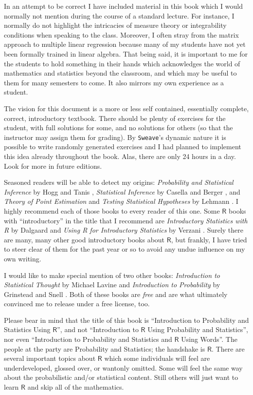 \documentclass[captions=tableheading]{scrbook}
\begin{document}
In an attempt to be correct I have included material in this book which I would normally not mention during the course of a standard lecture. For instance, I normally do not highlight the intricacies of measure theory or integrability conditions when speaking to the class. Moreover, I often stray from the matrix approach to multiple linear regression because many of my students have not yet been formally trained in linear algebra. That being said, it is important to me for the students to hold something in their hands which acknowledges the world of mathematics and statistics beyond the classroom, and which may be useful to them for many semesters to come. It also mirrors my own experience as a student.

The vision for this document is a more or less self contained, essentially complete, correct, introductory textbook. There should be plenty of exercises for the student, with full solutions for some, and no solutions for others (so that the instructor may assign them for grading). By \texttt{Sweave}'s dynamic nature it is possible to write randomly generated exercises and I had planned to implement this idea already throughout the book. Alas, there are only 24 hours in a day. Look for more in future editions.

Seasoned readers will be able to detect my origins: \emph{Probability and Statistical Inference} by Hogg and Tanis \cite{Hogg2006}, \emph{Statistical Inference} by Casella and Berger \cite{Casella2002}, and \emph{Theory of Point Estimation} and \emph{Testing Statistical Hypotheses} by Lehmann \cite{Lehmann1998,Lehmann1986}. I highly recommend each of those books to every reader of this one. Some \(\mathsf{R}\) books with ``introductory'' in the title that I recommend are \emph{Introductory Statistics with R} 
by Dalgaard \cite{Dalgaard2008} and \emph{Using R for Introductory Statistics} by Verzani \cite{Verzani2005}. Surely there are many, many other good introductory books about \(\mathsf{R}\), but frankly, I have tried to steer clear of them for the past year or so to avoid any undue influence on my own writing.

I would like to make special mention of two other books: \emph{Introduction to Statistical Thought} by Michael Lavine \cite{Lavine2009} and \emph{Introduction to Probability} by Grinstead and Snell \cite{Grinstead1997}. Both of these books are \emph{free} and are what ultimately convinced me to release \IPSUR under a free license, too.

Please bear in mind that the title of this book is ``Introduction to Probability and Statistics Using \(\mathsf{R}\)'', and not ``Introduction to \(\mathsf{R}\) Using Probability and Statistics'', nor even ``Introduction to Probability and Statistics and \(\mathsf{R}\) Using Words''. The people at the party are Probability and Statistics; the handshake is \(\mathsf{R}\). There are several important topics about \(\mathsf{R}\) which some individuals will feel are underdeveloped, glossed over, or wantonly omitted. Some will feel the same way about the probabilistic and/or statistical content. Still others will just want to learn \(\mathsf{R}\) and skip all of the mathematics.
\end{document}
